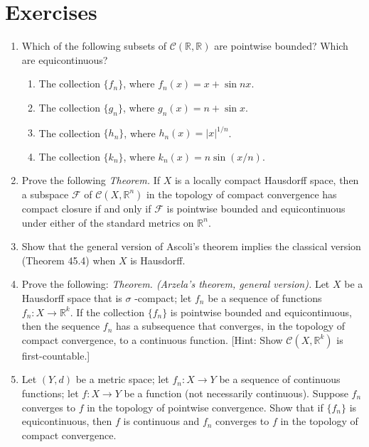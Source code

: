 \section*{Exercises}
\begin{enumerate}[itemsep=0.4em, parsep=0pt, topsep=0pt, partopsep=0pt, leftmargin=*, label=\arabic*., ref=\arabic*]
\item Which of the following subsets of \(\mathcal{C}({\mathbb{R},\mathbb{R}})\) are pointwise bounded? Which are equicontinuous?
 \begin{enumerate}[itemsep=0.2em, parsep=0pt, topsep=0pt, partopsep=0pt, leftmargin=*, label=(\alph*), align=left]
 \item The collection \(\{ f_{n}\}\), where \(f_{n}(x) = x + \sin {nx}\).
 \item The collection \(\{ g_{n}\}\), where \(g_{n}(x) = n + \sin x\).
 \item The collection \(\{ h_{n}\}\), where \(h_{n}(x) = {| x| }^{1/n}\).
 \item The collection \(\{ k_{n}\}\), where \(k_{n}(x) = n\sin ({x/n})\).
 \end{enumerate}
\item Prove the following \textsl{Theorem.} If \(X\) is a locally compact Hausdorff space, then a subspace \(\mathcal{F}\) of \(\mathcal{C}({X,\mathbb{R}^{n}})\) in the topology of compact convergence has compact closure if and only if \(\mathcal{F}\) is pointwise bounded and equicontinuous under either of the standard metrics on \(\mathbb{R}^{n}\). 
\item Show that the general version of Ascoli's theorem implies the classical version (Theorem 45.4) when \(X\) is Hausdorff.
\item Prove the following: \textsl{Theorem. (Arzela's theorem, general version).} Let \(X\) be a Hausdorff space that is \(\sigma\) -compact; let \(f_{n}\) be a sequence of functions \(f_{n} : X \rightarrow {\mathbb{R}}^{k}\). If the collection \(\{ f_{n}\}\) is pointwise bounded and equicontinuous, then the sequence \(f_{n}\) has a subsequence that converges, in the topology of compact convergence, to a continuous function. [Hint: Show \(\mathcal{C}({X,\mathbb{R}^{k}})\) is first-countable.]
\item Let \((Y, d)\) be a metric space; let \(f_{n} : X \rightarrow Y\) be a sequence of continuous functions; let \(f : X \rightarrow Y\) be a function (not necessarily continuous). Suppose \(f_{n}\) converges to \(f\) in the topology of pointwise convergence. Show that if \(\{ f_{n}\}\) is equicontinuous, then \(f\) is continuous and \(f_{n}\) converges to \(f\) in the topology of compact convergence.
\end{enumerate}